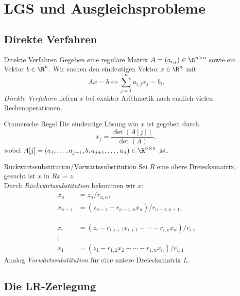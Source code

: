 \section{LGS und Ausgleichsprobleme}

\subsection*{Direkte Verfahren}

\begin{karte}{Direkte Verfahren}
    Gegeben eine reguläre Matrix \( A = (a_{i,j}) \in \R^{n\times n} \) sowie ein Vektor 
    \( b \in \R^n \). Wir suchen den eindeutigen Vektor \(x \in \R^n\) mit 
    \[ Ax = b \Leftrightarrow \sum_{j=1}^n a_{i,j} x_j = b_i. \]
    \textit{Direkte Verfahren} liefern \(x \) bei exakter Arithmetik nach 
    endlich vielen Rechenoperationen.
\end{karte}

\begin{karte}{Cramersche Regel}
    Die eindeutige Lösung von \( x \) ist gegeben durch 
    \[ x_j = \frac{ \det(A[j]) }{ \det(A) }, \]
    wobei \( A[j] = (a_1, \ldots, a_{j-1}, b, a_{j+1}, \ldots, a_n) \in \R^{n\times n} \) ist.
\end{karte}

\begin{karte}{Rückwärtssubstitution/Vorwärtssubstitution}
    Sei \( R \) eine obere Dreiecksmatrix, gesucht ist \(x\) in \( Rx = z \).\\
    Durch \textit{Rückwärtssubstitution} bekommen wir \(x\):
    \begin{align*}
        x_n &= z_n / r_{n,n}, \\
        x_{n-1} &= (z_{n-1} - r_{n-1,n} x_n) / r_{n-1,n-1}, \\
        \vdots \\
        x_i &= (z_i - r_{i,i+1} x_{i+1} - \cdots - r_{i,n} x_n) / r_{i,i} \\
        \vdots \\
        x_1 &= (z_1 - r_{1,2}x_2 - \cdots - r_{1,n}x_n) / r_{1,1}.
    \end{align*}
    Analog \textit{Vorwärtssubstitution} für eine untere Dreiecksmatrix \(L\).
\end{karte}

\subsection*{Die LR-Zerlegung}

